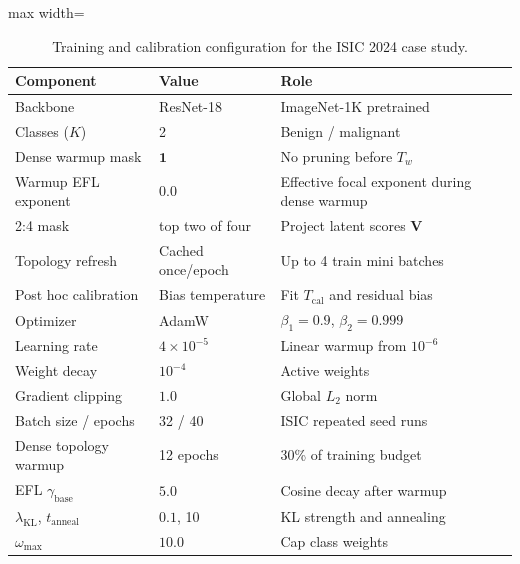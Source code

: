 \documentclass[letterpaper]{article}
\begin{document}
\begin{table}[tbp]
\centering
\caption{Training and calibration configuration for the ISIC 2024 case study.}
\label{tab:config}
\scriptsize
\renewcommand{\arraystretch}{0.96}
\begin{adjustbox}{max width=\columnwidth}
\begin{tabular}{@{}p{} p{} p{}@{}}
\toprule
\textbf{Component} & \textbf{Value} & \textbf{Role} \\
\midrule
Backbone & ResNet-18 \cite{he2016deep} & ImageNet-1K pretrained \cite{russakovsky2015imagenet} \\
Classes ($K$) & 2 & Benign / malignant \\
Dense warmup mask & $\bm{1}$ & No pruning before $T_w$ \\
Warmup EFL exponent & $0.0$ & Effective focal exponent during dense warmup \\
2:4 mask & top two of four & Project latent scores $\bm{V}$ \\
Topology refresh & Cached once/epoch & Up to 4 train mini batches \\
Post hoc calibration & Bias temperature & Fit $T_{\text{cal}}$ and residual bias \\
Optimizer & AdamW & $\beta_1=0.9$, $\beta_2=0.999$ \\
Learning rate & $4{\times}10^{-5}$ & Linear warmup from $10^{-6}$ \\
Weight decay & $10^{-4}$ & Active weights \\
Gradient clipping & $1.0$ & Global $L_2$ norm \\
Batch size / epochs & 32 / 40 & ISIC repeated seed runs \\
Dense topology warmup & 12 epochs & 30\% of training budget \\
EFL $\gamma_{\text{base}}$ & $5.0$ & Cosine decay after warmup \\
$\lambda_{\text{KL}}$, $t_{\text{anneal}}$ & $0.1$, 10 & KL strength and annealing \\
$\omega_{\max}$ & $10.0$ & Cap class weights \\
\bottomrule
\end{tabular}
\end{adjustbox}
\end{table}
\end{document}
